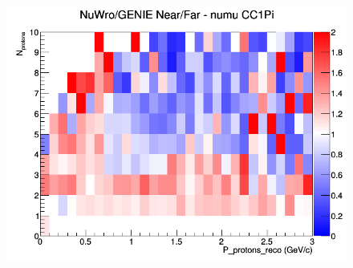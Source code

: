 \begin{figure}[h]
\endminipage
{}
\includegraphics[width=\linewidth]{eff_N_P/FGT/protons/ratios/CC1Pi_NuWro_GENIE_numu_NF_N_P.png}
\endminipage
\newline
\end{figure}
\clearpage

